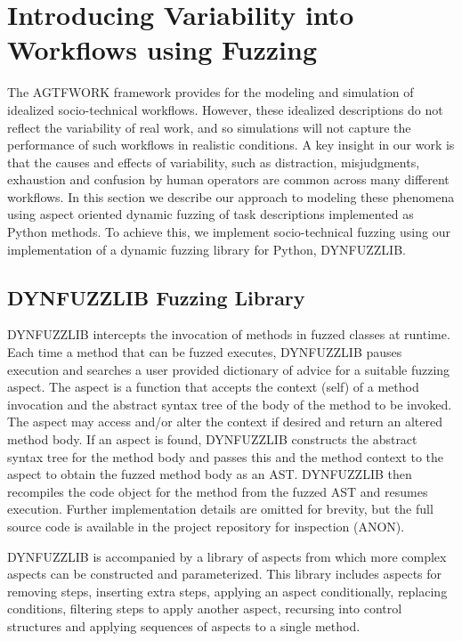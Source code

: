 \documentclass{llncs}
\begin{document}
\section{Introducing Variability into Workflows using Fuzzing}

The AGTFWORK framework provides for the modeling and simulation of idealized socio-technical workflows.  However, these
idealized descriptions do not reflect the variability of real work, and so simulations will not capture the performance
of such workflows in realistic conditions.  A key insight in our work is that the causes and effects of variability,
such as distraction, misjudgments, exhaustion and confusion by human operators are common across many different
workflows.  In this section we describe our approach to modeling these phenomena using aspect oriented dynamic fuzzing
of task descriptions implemented as Python methods.  To achieve this, we implement socio-technical fuzzing using our
implementation of a dynamic fuzzing library for Python, DYNFUZZLIB.

\subsection{DYNFUZZLIB Fuzzing Library}

DYNFUZZLIB intercepts the invocation of methods in fuzzed classes at runtime.  Each time a method that can be fuzzed
executes, DYNFUZZLIB pauses execution and searches a user provided dictionary of advice for a suitable fuzzing
aspect. The aspect is a function that accepts the context (self) of a method invocation and the abstract syntax tree of
the body of the method to be invoked.  The aspect may access and/or alter the context if desired and return an altered
method body.  If an aspect is found, DYNFUZZLIB constructs the abstract syntax tree for the method body and passes this
and the method context to the aspect to obtain the fuzzed method body as an AST.  DYNFUZZLIB then recompiles the code
object for the method from the fuzzed AST and resumes execution.  Further implementation details are omitted for
brevity, but the full source code is available in the project repository for inspection (ANON).

DYNFUZZLIB is accompanied by a library of aspects from which more complex aspects can be constructed and parameterized.
This library includes aspects for removing steps, inserting extra steps, applying an aspect conditionally, replacing
conditions, filtering steps to apply another aspect, recursing into control structures and applying sequences of aspects
to a single method.
\end{document}
